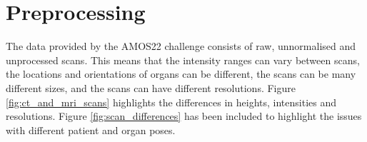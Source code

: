 \documentclass{l4proj}
\begin{document}
\section{Preprocessing} \label{sec:preprocessing_design}

The data provided by the AMOS22 challenge consists of raw, unnormalised and unprocessed scans. This means that the intensity ranges can vary between scans, the locations and orientations of organs can be different, the scans can be many different sizes, and the scans can have different resolutions. Figure \ref{fig:ct_and_mri_scans} highlights the differences in heights, intensities and resolutions. Figure \ref{fig:scan_differences} has been included to highlight the issues with different patient and organ poses.

\begin{figure}[htb] 
    \centering


\end{figure}
\end{document}
